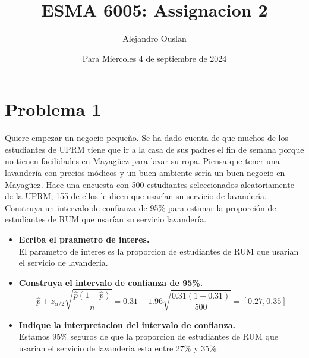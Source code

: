\documentclass[10pt, oneside]{article}
\title{ESMA 6005: Assignacion 2}
\author{Alejandro Ouslan}
\date{Para Miercoles 4 de septiembre de 2024}
\begin{document}
\maketitle

\vspace{.25in}

\section{Problema 1}
Quiere empezar un negocio pequeño. Se ha dado cuenta de que muchos de los estudiantes de
UPRM tiene que ir a la casa de sus padres el fin de semana porque no tienen facilidades en
Mayagüez para lavar su ropa. Piensa que tener una lavandería con precios módicos y un buen
ambiente sería un buen negocio en Mayagüez. Hace una encuesta con 500 estudiantes
seleccionados aleatoriamente de la UPRM, 155 de ellos le dicen que usarían su servicio de
lavandería. Construya un intervalo de confianza de 95\% para estimar la proporción de
estudiantes de RUM que usarían su servicio lavandería.

\begin{itemize}
	\item \textbf{Ecriba el praametro de interes.}\\
	      El parametro de interes es la proporcion de estudiantes de RUM que usarian el servicio de lavanderia.
	\item \textbf{Construya el intervalo de confianza de 95\%.}
	      \[
		      \hat{p} \pm z_{\alpha/2} \sqrt{\frac{\hat{p}(1-\hat{p})}{n}} = 0.31 \pm 1.96 \sqrt{\frac{0.31(1-0.31)}{500}} = [0.27,0.35]
	      \]
	\item \textbf{Indique la interpretacion del intervalo de confianza.}\\
	      Estamos 95\% seguros de que la proporcion de estudiantes de RUM que usarian el servicio de lavanderia esta entre 27\% y 35\%.


\end{itemize}
\end{document}
